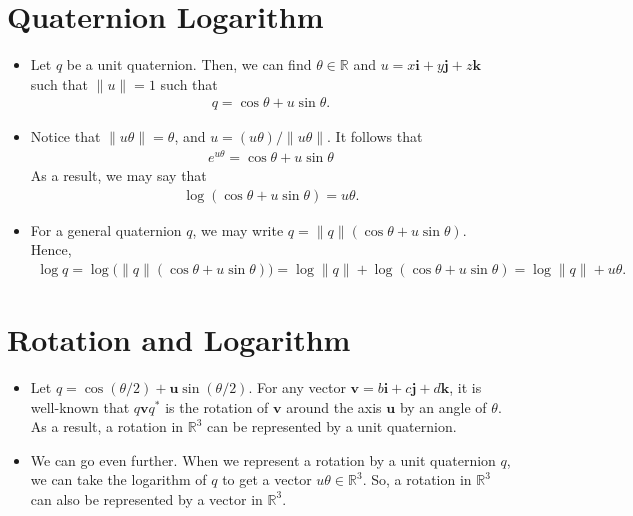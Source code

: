 \documentclass[10pt]{article}
\newcommand{\ve}[1]{\mathbf{#1}}
\newcommand{\Real}{\mathbb{R}}
\begin{document}
\section{Quaternion Logarithm}

\begin{itemize}
    \item Let $q$ be a unit quaternion. Then, we can find $\theta \in \Real$ and $u = x\ve{i} + y\ve{j} + z\ve{k}$ such that $\| u \| = 1$ such that
    \begin{align*}
        q = \cos\theta + u \sin\theta.
    \end{align*}

    \item Notice that $\| u\theta \| = \theta$, and $u = (u\theta)/\|u\theta\|$. It follows that
    \begin{align*}
        e^{u\theta} = \cos\theta + u \sin\theta
    \end{align*}
    As a result, we may say that
    \begin{align*}
        \log (\cos \theta + u \sin \theta) = u\theta.
    \end{align*}

    \item For a general quaternion $q$, we may write $q = \|q\| (\cos \theta + u \sin \theta)$. Hence,
    \begin{align*}
        \log q = \log \big( \|q\| (\cos \theta + u \sin \theta) \big) = \log \|q\| + \log (\cos \theta + u \sin \theta) = \log \|q\| + u\theta.
    \end{align*}
\end{itemize}

\section{Rotation and Logarithm}

\begin{itemize}
    \item Let $q = \cos (\theta/2) + \ve{u} \sin (\theta/2)$. For any vector $\ve{v} = b \ve{i} + c \ve{j} + d \ve{k}$, it is well-known that $q\ve{v}q^*$ is the rotation of $\ve{v}$ around the axis $\ve{u}$ by an angle of $\theta$. As a result, a rotation in $\Real^3$ can be represented by a unit quaternion.
    
    \item We can go even further. When we represent a rotation by a unit quaternion $q$, we can take the logarithm of $q$ to get a vector $u \theta \in \Real^3$. So, a rotation in $\Real^3$ can also be represented by a vector in $\Real^3$.
\end{itemize}



  
\end{document}
